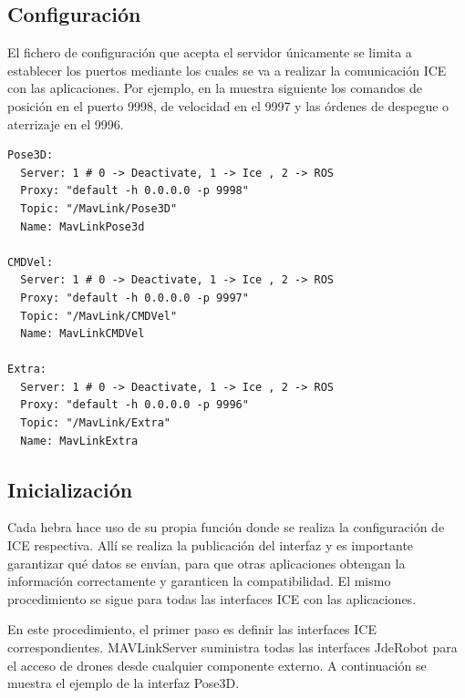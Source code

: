 \subsection{Configuración}
El fichero de configuración que acepta el servidor únicamente se limita a establecer los puertos mediante los cuales se va a realizar la comunicación ICE con las aplicaciones. Por ejemplo, en la muestra siguiente los comandos de posición en el puerto 9998, de velocidad en el 9997 y las órdenes de despegue o aterrizaje en el 9996.

\begin{lstlisting}[frame=single]
Pose3D:
  Server: 1 # 0 -> Deactivate, 1 -> Ice , 2 -> ROS
  Proxy: "default -h 0.0.0.0 -p 9998"
  Topic: "/MavLink/Pose3D"
  Name: MavLinkPose3d

CMDVel:
  Server: 1 # 0 -> Deactivate, 1 -> Ice , 2 -> ROS
  Proxy: "default -h 0.0.0.0 -p 9997"
  Topic: "/MavLink/CMDVel"
  Name: MavLinkCMDVel

Extra:
  Server: 1 # 0 -> Deactivate, 1 -> Ice , 2 -> ROS
  Proxy: "default -h 0.0.0.0 -p 9996"
  Topic: "/MavLink/Extra"
  Name: MavLinkExtra
\end{lstlisting}

\subsection{Inicialización}

Cada hebra hace uso de su propia función donde se realiza la configuración de ICE respectiva. Allí se realiza la publicación del interfaz y es importante garantizar qué datos se envían, para que otras aplicaciones obtengan la información correctamente y garanticen la compatibilidad. El mismo procedimiento se sigue para todas las interfaces ICE con las aplicaciones.

En este procedimiento, el primer paso es definir las interfaces ICE correspondientes. MAVLinkServer suministra todas las interfaces JdeRobot para el acceso de drones desde cualquier componente externo. A continuación se muestra el ejemplo de la interfaz Pose3D.

\bigskip
\bigskip

